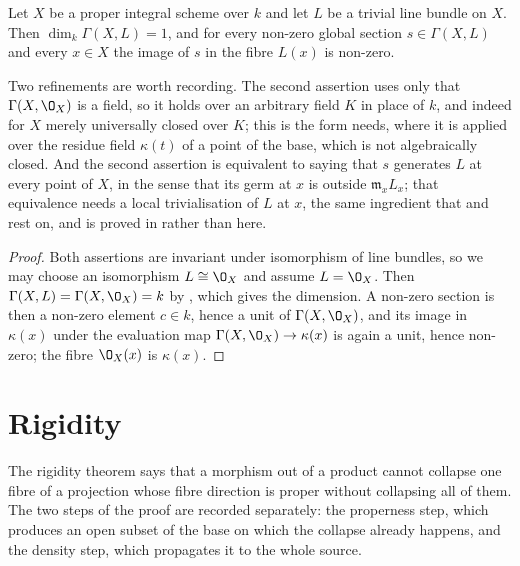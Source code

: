 \begin{lemma}
\label{lem:cube-nowhere-vanishing}
\leanok
Let $X$ be a proper integral scheme over $k$ and let $L$ be a trivial line
bundle on $X$.  Then $\dim_k\Gamma(X,L)=1$, and for every non-zero global
section $s\in\Gamma(X,L)$ and every $x\in X$ the image of $s$ in the fibre
$L(x)$ is non-zero.

Two refinements are worth recording.  The second assertion uses only that
$\Gamma(X,\O_X)$ is a field, so it holds over an arbitrary field $K$ in place
of $k$, and indeed for $X$ merely universally closed over $K$; this is the
form  needs, where it is applied over the
residue field $\kappa(t)$ of a point of the base, which is not algebraically
closed.  And the second assertion is equivalent to saying that $s$ generates
$L$ at every point of $X$, in the sense that its germ at $x$ is outside
$\mathfrak m_xL_x$; that equivalence needs a local trivialisation of $L$ at
$x$, the same ingredient that  and
 rest on, and is proved in
 rather than here.
\end{lemma}
\begin{proof}
\leanok
Both assertions are invariant under isomorphism of line bundles, so we may
choose an isomorphism $L\cong\O_X$ and assume $L=\O_X$.  Then
$\Gamma(X,L)=\Gamma(X,\O_X)=k$ by , which gives
the dimension.  A non-zero section is then a non-zero element $c\in k$, hence
a unit of $\Gamma(X,\O_X)$, and its image in $\kappa(x)$ under the evaluation
map $\Gamma(X,\O_X)\to\kappa(x)$ is again a unit, hence non-zero; the fibre
$\O_X(x)$ is $\kappa(x)$.
\end{proof}

\section{Rigidity}\label{sec:cube-rigidity}

The rigidity theorem says that a morphism out of a product cannot collapse one
fibre of a projection whose fibre direction is proper without collapsing all
of them.  The two steps of the proof are recorded separately: the properness
step, which produces an open subset of the base on which the collapse already
happens, and the density step, which propagates it to the whole source.

